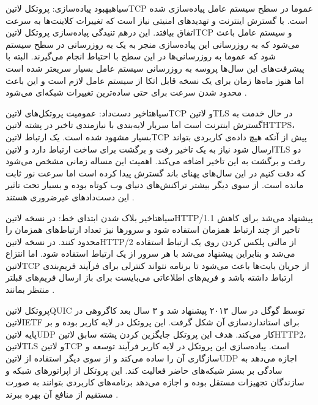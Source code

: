 ‌سیاه{بهبود پیاده‌سازی}: پروتکل ‌لاتین{TCP} عموما در سطح سیستم عامل پیاده‌سازی شده است. با گسترش اینترنت و تهدیدهای امنیتی نیاز است که تغییرات کلاینت‌ها به سرعت اتفاق بیافتد.
این درهم تنیدگی پیاده‌سازی پروتکل ‌لاتین{TCP} و سیستم عامل باعث می‌شود که به روزرسانی این پیاده‌سازی منجر به یک به روزرسانی در سطح سیستم شود که عموما به روزرسانی‌ها در این سطح
با احتیاط انجام می‌گیرند. البته با پیشرفت‌های این سال‌ها پروسه به روزرسانی سیستم عامل بسیار سریعتر شده است اما هنوز ماه‌ها زمان برای یک نسخه قابل اتکا از سیستم عامل لازم است و این باعث
محدود شدن سرعت برای حتی ساده‌ترین تغییرات شبکه‌ای می‌شود
.

‌سیاه{تاخیر دست‌داد}: عمومیت پروتکل‌های ‌لاتین{TCP} و ‌لاتین{TLS} در حال خدمت به گسترش اینترنت است اما سربار لایه‌بندی با نیازمندی تاخیر در پشته ‌لاتین{HTTPS}،
بسیار مشهود شده است. یک ارتباط ‌لاتین{TCP} پیش از آنکه هیچ داده‌ی کاربردی بتواند ارسال شود نیاز به یک تاخیر رفت و برگشت برای ساخت ارتباط دارد و ‌لاتین{TLS} دو رفت و برگشت
به این تاخیر اضافه می‌کند. اهمیت این مساله زمانی مشخص می‌شود که دقت کنیم در این سال‌های پهنای باند گسترش پیدا کرده است اما سرعت نور ثابت مانده است. از سوی دیگر بیشتر تراکنش‌های دنیای وب
کوتاه بوده و بسیار تحت تاثیر این دست‌دادهای غیرضروری هستند
.

‌سیاه{تاخیر بلاک شدن ابتدای خط}: در نسخه ‌لاتین{HTTP/1.1} پیشنهاد می‌شد برای کاهش تاخیر از چند ارتباط همزمان استفاده شود و سرورها نیز تعداد ارتباط‌های همزمان را محدود کنند.
در نسخه ‌لاتین{HTTP/2} از مالتی پلکس کردن روی یک ارتباط استفاده می‌شد و بنابراین پیشنهاد می‌شد با هر سرور از یک ارتباط استفاده شود.
اما انتزاع ‌لاتین{TCP} از جریان بایت‌ها باعث می‌شود تا برنامه نتواند کنترلی برای فرآیند فریم‌بندی ارتباط داشته باشد و فریم‌های اطلاعاتی می‌بایست برای باز ارسال فریم‌های قبلتر منتظر بمانند
.

پروتکل ‌لاتین{QUIC} توسط گوگل در سال ۲۰۱۳ پیشنهاد شد و ۳ سال بعد کاگروهی در ‌لاتین{IETF} برای استانداردسازی آن شکل گرفت. این پروتکل در لایه کاربر بوده و بر پایه ‌لاتین{UDP} کار می‌کند.
هدف این پروتکل جایگزین کردن پشته سابق ‌لاتین{HTTP2}، ‌لاتین{TLS} و ‌لاتین{TCP} است.
پیاده‌سازی این پروتکل در لایه کاربر فرآیند توسعه و سازگاری آن را ساده می‌کند و از سوی دیگر استفاده از ‌لاتین{UDP} اجازه می‌دهد به سادگی بر بستر شبکه‌های حاضر فعالیت کند.
این پروتکل از اپراتورهای شبکه و سازندگان تجهیزات مستقل بوده و اجازه می‌دهد برنامه‌های کاربردی بتوانند به صورت مستقیم از منافع آن بهره ببرند
.

